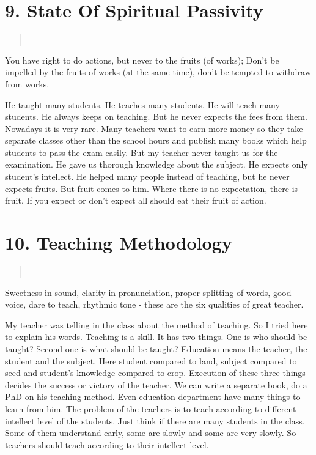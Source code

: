 \section*{9. State Of Spiritual Passivity }
\begin{verse}
\\
\end{verse}
You have right to do actions, but never to the fruits (of works); Don’t be impelled by the fruits of works (at the same time), don’t be tempted to withdraw from works.

He taught many students. He teaches many students. He will teach many students. He always keeps on teaching. But he never expects the fees from them. Nowadays it is very rare. Many teachers want to earn more money so they take separate classes other than the school hours and publish many books which help students to pass the exam easily. But my teacher never taught us for the examination. He gave us thorough knowledge about the subject. He expects only student’s intellect. He helped many people instead of teaching, but he never expects fruits. But fruit comes to him. Where there is no expectation, there is fruit. If you expect or don’t expect all should eat their fruit of action.

\section*{10. Teaching Methodology }
\begin{verse}
\\
\end{verse}
Sweetness in sound, clarity in pronunciation, proper splitting of words, good voice, dare to teach, rhythmic tone -  these are the six qualities of great teacher.

My teacher was telling in the class about the method of teaching. So I tried here to explain his words. Teaching is a skill. It has two things. One is who should be taught? Second one is what should be taught? Education means the teacher, the student and the subject. Here student compared to land, subject compared to seed and student’s knowledge compared to crop. Execution of these three things decides the success or victory of the teacher. We can write a separate book, do a PhD on his teaching method. Even education department have many things to learn from him. The problem of the teachers is to teach according to different intellect level of the students. Just think if there are many students in the class. Some of them understand early, some are slowly and some are very slowly. So teachers should teach according to their intellect level.


